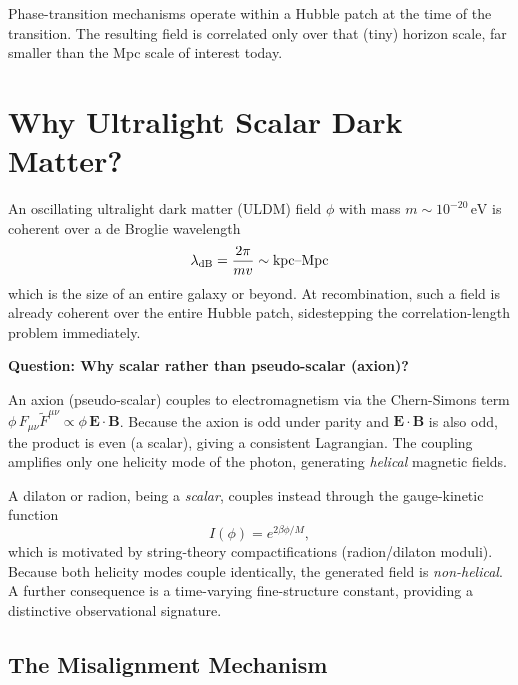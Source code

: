 \documentclass[12pt,a4paper,openany]{book}
\newcommand{\Fmn}{F_{\mu\nu}}
\newcommand{\Fdual}{\tilde{F}^{\mu\nu}}
\begin{document}
Phase-transition mechanisms operate within a Hubble patch at the time of the transition. The resulting field is correlated only over that (tiny) horizon scale, far smaller than the Mpc scale of interest today.

\section{Why Ultralight Scalar Dark Matter?}

An oscillating ultralight dark matter (ULDM) field $\phi$ with mass $m \sim 10^{-20}\,\mathrm{eV}$ is coherent over a de Broglie wavelength
\begin{equation}
  \lambda_{\rm dB} = \frac{2\pi}{mv} \sim \mathrm{kpc}\text{--}\mathrm{Mpc}
\end{equation}
which is the size of an entire galaxy or beyond. At recombination, such a field is already coherent over the entire Hubble patch, sidestepping the correlation-length problem immediately.

\medskip
\noindent\textbf{Question: Why scalar rather than pseudo-scalar (axion)?}

An axion (pseudo-scalar) couples to electromagnetism via the Chern-Simons term $\phi\,\Fmn\Fdual \propto \phi\,\mathbf{E}\cdot\mathbf{B}$. Because the axion is odd under parity and $\mathbf{E}\cdot\mathbf{B}$ is also odd, the product is even (a scalar), giving a consistent Lagrangian. The coupling amplifies only one helicity mode of the photon, generating \emph{helical} magnetic fields.

A dilaton or radion, being a \emph{scalar}, couples instead through the gauge-kinetic function
\begin{equation}
  I(\phi) = e^{2\beta\phi/M},
\end{equation}
which is motivated by string-theory compactifications (radion/dilaton moduli). Because both helicity modes couple identically, the generated field is \emph{non-helical}. A further consequence is a time-varying fine-structure constant, providing a distinctive observational signature.

\subsection{The Misalignment Mechanism}
\end{document}
